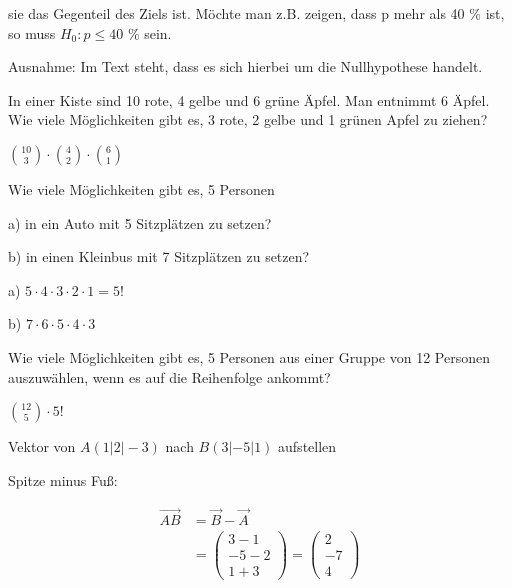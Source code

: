 \begin{antwort}sie das Gegenteil des Ziels ist. Möchte man z.B. zeigen, dass p mehr als 40 $\%$ ist,
	so muss $H_0: p \le 40$ $\%$ sein.
	
	Ausnahme: Im Text steht, dass es sich hierbei um die Nullhypothese handelt.\end{antwort}
\begin{frage}\LARGE
	In einer Kiste sind 10 rote, 4 gelbe und 6 grüne Äpfel. Man entnimmt 6 Äpfel. Wie viele Möglichkeiten gibt es, 3 rote, 2 gelbe und 1 grünen Apfel zu ziehen?\end{frage}
\begin{antwort}\LARGE
	$\binom{10}{3} \cdot \binom{4}{2} \cdot \binom{6}{1}$\end{antwort}
\begin{frage}\LARGE
	Wie viele Möglichkeiten gibt es, 5 Personen 
	
	a) in ein Auto mit 5 Sitzplätzen zu setzen?
	
	b) in einen Kleinbus mit 7 Sitzplätzen zu setzen?\end{frage}
\begin{antwort}\LARGE
	a) $5 \cdot 4 \cdot 3\cdot 2 \cdot 1=5!$
	
	\vspace{0.5cm}
	b) $7 \cdot 6 \cdot 5\cdot 4 \cdot 3$\end{antwort}
\begin{frage}\LARGE
	Wie viele Möglichkeiten gibt es, 5 Personen aus einer Gruppe von 12 Personen auszuwählen, wenn
	es auf die Reihenfolge ankommt?\end{frage}
\begin{antwort}\LARGE
	$\binom{12}{5} \cdot 5!$\end{antwort}
\begin{frage}Vektor von $A(1|2|-3)$ nach $B(3|-5|1)$ aufstellen\end{frage}
\begin{antwort}Spitze minus Fuß:
	
	\bigskip		
	\begin{align*}
		\vec{AB}&=\vec{B}-\vec{A} \\
		&=\left(\begin{array}{c} 3-1 \\ -5-2 \\ 1+3\end{array} \right)=\left(\begin{array}{c} 2 \\ -7 \\ 4\end{array} \right)
	\end{align*}\end{antwort}
